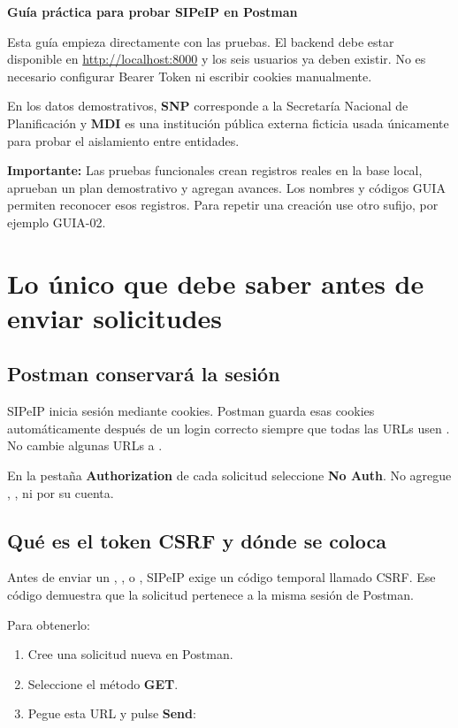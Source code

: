 \documentclass[11pt,a4paper]{article}
\newcommand{\atencion}[1]{\textcolor{RojoAtencion}{\textbf{Importante:}} #1}
\begin{document}
{\LARGE\bfseries\color{AzulSipeip} Guía práctica para probar SIPeIP en Postman}

Esta guía empieza directamente con las pruebas. El backend debe estar disponible en \url{http://localhost:8000} y los seis usuarios ya deben existir. No es necesario configurar Bearer Token ni escribir cookies manualmente.

En los datos demostrativos, \textbf{SNP} corresponde a la Secretaría Nacional de Planificación y \textbf{MDI} es una institución pública externa ficticia usada únicamente para probar el aislamiento entre entidades.

\atencion{Las pruebas funcionales crean registros reales en la base local, aprueban un plan demostrativo y agregan avances. Los nombres y códigos GUIA permiten reconocer esos registros. Para repetir una creación use otro sufijo, por ejemplo GUIA-02.}

\section{Lo único que debe saber antes de enviar solicitudes}

\subsection{Postman conservará la sesión}

SIPeIP inicia sesión mediante cookies. Postman guarda esas cookies automáticamente después de un login correcto siempre que todas las URLs usen . No cambie algunas URLs a .

En la pestaña \textbf{Authorization} de cada solicitud seleccione \textbf{No Auth}. No agregue , ,  ni  por su cuenta.

\subsection{Qué es el token CSRF y dónde se coloca}

Antes de enviar un , ,  o , SIPeIP exige un código temporal llamado CSRF. Ese código demuestra que la solicitud pertenece a la misma sesión de Postman.

Para obtenerlo:

\begin{enumerate}
  \item Cree una solicitud nueva en Postman.
  \item Seleccione el método \textbf{GET}.
  \item Pegue esta URL y pulse \textbf{Send}:
\end{enumerate}
\end{document}
